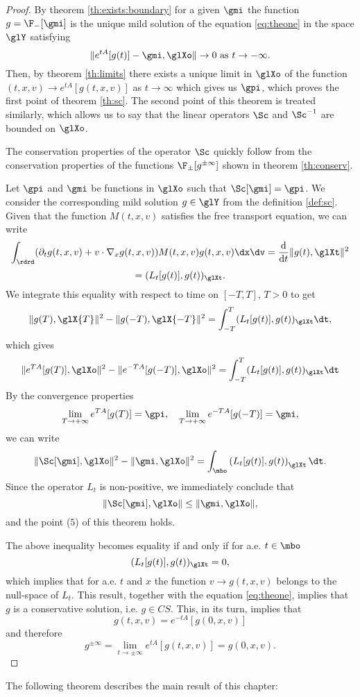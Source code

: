 \begin{proof}
	By   theorem \ref{th:exists:boundary} for a given $\gmi$ the function $g=\F_-[\gmi]$ is the unique mild solution of the equation \eqref{eq:theone} in the space $\glY$ satisfying \[\|e^{tA}[g(t)]-\gmi,\glXo\|\to 0\mbox{ as }t\to -\infty.\]
	Then, by   theorem \ref{th:limits} there exists a unique limit in $\glXo$ of the function $(t,x,v)\to e^{tA}[g(t,x,v)]$ as $t\to\infty$ which gives us $\gpi$, which proves the first point of   theorem \ref{th:sc}. The second point of this theorem is treated similarly, which allows us to say that the linear operators $\Sc$ and $\Sc^{-1}$ are bounded on $\glXo$.

	The conservation properties of the operator $\Sc$ quickly follow from the conservation properties of the functions $\F_\pm[ g^{\pm\infty} ]$ shown in theorem \ref{th:conserv}.

	Let $\gpi$ and $\gmi$ be functions in $\glXo$ such that $\Sc[\gmi]=\gpi$. We consider the corresponding mild solution $g\in\glY$ from the definition \ref{def:sc}. Given that the function $M(t,x,v)$ satisfies the free transport equation, we can write 
	\[\int_\rdrd(\partial_t g(t,x,v)+v\cdot\nabla_x g(t,x,v))M(t,x,v)g(t,x,v)\dx\dv = \frac{\mathrm d}{\mathrm dt  } \|g(t),\glXt\|^2\]
	\[=(L_t[g(t)],g(t))_{\glXt}.\]
	We integrate this equality with respect to time 
	on $[-T,T]$, $T>0$ to get
	\[ \|g(T),\glX{T}\|^2 -\|g(-T),\glX{-T}\|^2=\int_{-T}^{T}(L_t[g(t)],g(t))_{\glXt}\dt,\]
	which gives
	\[ \|e^{TA}[g(T)],\glXo\|^2-\|e^{-TA}[g(-T)],\glXo\|^2=\int_{-T}^{T}(L_t[g(t)],g(t))_{\glXt}\dt\]
	By the convergence properties \[\lim_{T\to+\infty}e^{TA}[g(T)] = \gpi, \quad \lim_{T\to+\infty}e^{-TA}[g(-T)] = \gmi,\]  we can write
	\[ \|\Sc[\gmi],\glXo\|^2 -\|\gmi,\glXo\|^2=\int_{\mbo}\left(L_t[g(t)],g(t)\right)_{\glXt}\dt.\]
	Since the operator $L_t$ is non-positive, we immediately conclude that
	\[\|\Sc[\gmi],\glXo\|  \le  \|\gmi,\glXo\|,\]
	and the point ($5$) of this theorem holds.

	The above inequality becomes equality if and only if for a.e. $t\in\mbo$ \[ (L_t[g(t)],g(t))_{\glXt}=0,\] which implies that for a.e. $t$ and $x$ the function $v\to g(t,x,v)$ belongs to the null-space of $L_t$. This result, together with the equation \eqref{eq:theone}, implies that $g$ is a conservative solution, i.e. $g\in CS$. This, in its turn, implies that \[
	g(t,x,v)=e^{-tA}[g(0,x,v)]\]
	and therefore
	\[g^{\pm \infty	} = \lim_{t\to\pm \infty}e^{tA}[g(t,x,v)] = g(0,x,v).\]
\end{proof}
The following theorem describes the main result of this chapter:
